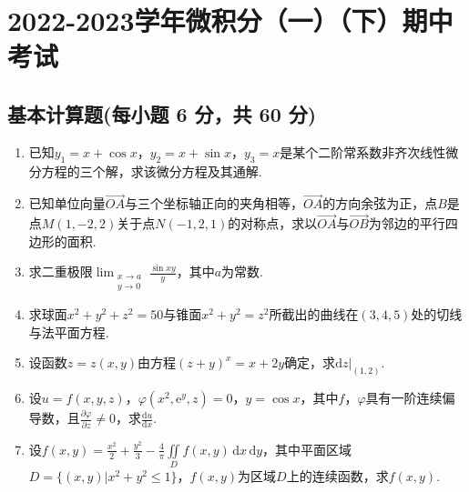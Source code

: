 \documentclass[../Main.tex]{subfiles}
\begin{document}
\chapter{2022-2023学年微积分（一）（下）期中考试}

\section{基本计算题(每小题 6 分，共 60 分)}
\begin{enumerate}
    \item 已知$y_{1}=x+\cos x$，$y_{2}=x+\sin x$，$y_{3}=x$是某个二阶常系数非齐次线性微分方程的三个解，求该微分方程及其通解.
          \vspace{10em}

    \item 已知单位向量$\overrightarrow{OA}$与三个坐标轴正向的夹角相等，$\overrightarrow
              {OA}$的方向余弦为正，点$B$是点$M(1,-2,2)$关于点$N(-1,2,1)$的对称点，求以$\overrightarrow
              {OA}$与$\overrightarrow{OB}$为邻边的平行四边形的面积.
          \vspace{11em}

    \item 求二重极限$\lim_{\substack{x\to a \\ y\to 0}}\frac{\sin xy}{y}$，其中$a$为常数.
          \vspace{11em}

    \item 求球面$x^{2}+y^{2}+z^{2}=50$与锥面$x^{2}+y^{2}=z^{2}$所截出的曲线在$(3,
              4,5)$处的切线与法平面方程.
          \vspace{13em}

    \item 设函数$z=z(x,y)$由方程$(z+y)^{x}=x+2y$确定，求$\left.\mathrm{d}z\right|
              _{(1,2)}$.
          \vspace{13em}

    \item 设$u=f(x,y,z)$，$\varphi\left(x^{2},\mathrm{e}^{y},z\right)=0$，$y=\cos
              x$，其中$f$，$\varphi$具有一阶连续偏导数，且$\frac{\partial \varphi}{\partial
                  z}\neq 0$，求$\frac{\mathrm{d}u}{\mathrm{d}x}$.
          \vspace{13em}

    \item 设$f(x,y)=\frac{x^{2}}{2}+\frac{y^{2}}{3}-\frac{4}{\pi}\iint\limits_{D}
              f(x,y)\,\mathrm{d}x\,\mathrm{d}y$，其中平面区域$D=\{(x,y)|x^{2}+y^{2}\leq 1\}$，$f
              (x,y)$为区域$D$上的连续函数，求$f(x,y)$.
          \vspace{12em}


\end{enumerate}
\end{document}

